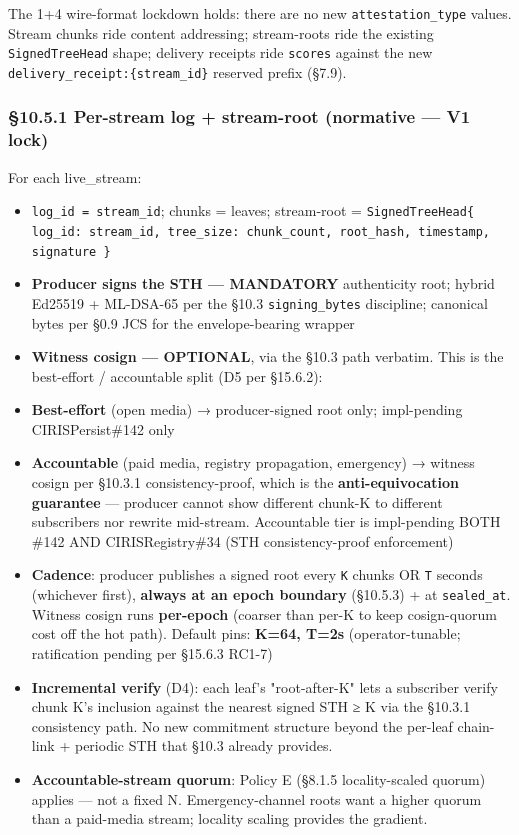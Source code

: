 \documentclass[10pt]{article}
\begin{document}
The 1+4 wire-format lockdown holds: there are no new \texttt{attestation\_type} values. Stream chunks ride content addressing; stream-roots ride the existing \texttt{SignedTreeHead} shape; delivery receipts ride \texttt{scores} against the new \texttt{delivery\_receipt:\{stream\_id\}} reserved prefix (§7.9).


\subsubsection*{§10.5.1 Per-stream log + stream-root (normative — V1 lock)}


For each live\_stream:


\begin{itemize}\setlength\itemsep{0pt}
\item \texttt{log\_id = stream\_id}; chunks = leaves; stream-root = \texttt{SignedTreeHead\{ log\_id: stream\_id, tree\_size: chunk\_count, root\_hash, timestamp, signature \}}
\item \textbf{Producer signs the STH — MANDATORY} authenticity root; hybrid Ed25519 + ML-DSA-65 per the §10.3 \texttt{signing\_bytes} discipline; canonical bytes per §0.9 JCS for the envelope-bearing wrapper
\item \textbf{Witness cosign — OPTIONAL}, via the §10.3 path verbatim. This is the best-effort / accountable split (D5 per §15.6.2):
\item \textbf{Best-effort} (open media) → producer-signed root only; impl-pending CIRISPersist\#142 only
\item \textbf{Accountable} (paid media, registry propagation, emergency) → witness cosign per §10.3.1 consistency-proof, which is the \textbf{anti-equivocation guarantee} — producer cannot show different chunk-K to different subscribers nor rewrite mid-stream. Accountable tier is impl-pending BOTH \#142 AND CIRISRegistry\#34 (STH consistency-proof enforcement)
\item \textbf{Cadence}: producer publishes a signed root every \texttt{K} chunks OR \texttt{T} seconds (whichever first), \textbf{always at an epoch boundary} (§10.5.3) + at \texttt{sealed\_at}. Witness cosign runs \textbf{per-epoch} (coarser than per-K to keep cosign-quorum cost off the hot path). Default pins: \textbf{K=64, T=2s} (operator-tunable; ratification pending per §15.6.3 RC1-7)
\item \textbf{Incremental verify} (D4): each leaf's "root-after-K" lets a subscriber verify chunk K's inclusion against the nearest signed STH ≥ K via the §10.3.1 consistency path. No new commitment structure beyond the per-leaf chain-link + periodic STH that §10.3 already provides.
\item \textbf{Accountable-stream quorum}: Policy E (§8.1.5 locality-scaled quorum) applies — not a fixed N. Emergency-channel roots want a higher quorum than a paid-media stream; locality scaling provides the gradient.
\end{itemize}
\end{document}
